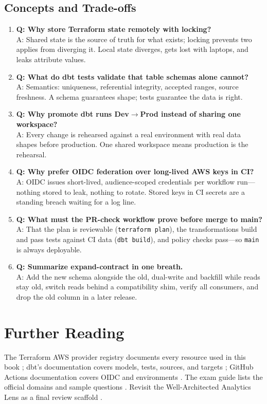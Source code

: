 \subsection{Concepts and Trade-offs}
\begin{enumerate}
    \item \textbf{Q: Why store Terraform state remotely with locking?}\\
    A: Shared state is the source of truth for what exists; locking prevents two applies from diverging it. Local state diverges, gets lost with laptops, and leaks attribute values.
    \item \textbf{Q: What do dbt tests validate that table schemas alone cannot?}\\
    A: Semantics: uniqueness, referential integrity, accepted ranges, source freshness. A schema guarantees shape; tests guarantee the data is right.
    \item \textbf{Q: Why promote dbt runs Dev$\rightarrow$Prod instead of sharing one workspace?}\\
    A: Every change is rehearsed against a real environment with real data shapes before production. One shared workspace means production is the rehearsal.
    \item \textbf{Q: Why prefer OIDC federation over long-lived AWS keys in CI?}\\
    A: OIDC issues short-lived, audience-scoped credentials per workflow run---nothing stored to leak, nothing to rotate. Stored keys in CI secrets are a standing breach waiting for a log line.
    \item \textbf{Q: What must the PR-check workflow prove before merge to main?}\\
    A: That the plan is reviewable (\texttt{terraform plan}), the transformations build and pass tests against CI data (\texttt{dbt build}), and policy checks pass---so \texttt{main} is always deployable.
    \item \textbf{Q: Summarize expand-contract in one breath.}\\
    A: Add the new schema alongside the old, dual-write and backfill while reads stay old, switch reads behind a compatibility shim, verify all consumers, and drop the old column in a later release.
\end{enumerate}

\section{Further Reading}
The Terraform AWS provider registry documents every resource used in this book \cite{terraformAWSProvider}; dbt's documentation covers models, tests, sources, and targets \cite{dbtCore}; GitHub Actions documentation covers OIDC and environments \cite{githubActionsDocs}. The exam guide lists the official domains and sample questions \cite{awsCertDataEngineer}. Revisit the Well-Architected Analytics Lens as a final review scaffold \cite{awsWellArchitectedAnalytics}.

